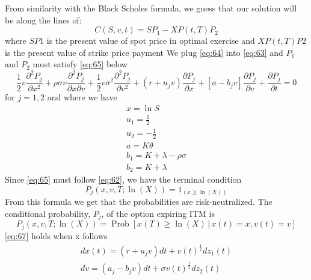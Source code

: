 \documentclass{article}
\DeclareMathOperator{\Prob}{Prob}
\begin{document}
From similarity with the Black Scholes formula, we guess that our solution will be along the lines of:
\begin{equation} \label{eq:64}
     C(S, v, t) = SP_{1} - XP(t, T)P_{2}
\end{equation}
where $SP1$ is the present value of spot price in optimal exercise and $XP(t, T)P2$ is the present value of strike price payment
We plug \ref{eq:64} into \ref{eq:63} and $P_{1}$ and $P_{2}$ must satisfy \ref{eq:65} below
\begin{equation} \label{eq:65}
    \frac{1}{2}v\frac{\partial^{2} P_{j}}{\partial x^{2}} + \rho \sigma v \frac{\partial^{2} P_{j}}{\partial x \partial v} + \frac{1}{2}v\sigma^{2}\frac{\partial^{2} P_{j}}{\partial v^{2}} + (r + u_{j} v) \frac{\partial P_{j}}{\partial x} + [a-b_{j}v] \frac{\partial P_{j}}{\partial v} + \frac{\partial P_{j}}{\partial t} = 0
\end{equation}
for $j=1,2$ and where we have 
\begin{equation*}
   \begin{gathered}
   x=\ln S \\
   u_{1} = \frac{1}{2} \\
   u_{2} = -\frac{1}{2} \\
   a = K\theta \\ 
   b_{1} = K + \lambda - \rho \sigma \\ 
   b_{2} = K + \lambda
   \end{gathered}
\end{equation*}
Since \ref{eq:65} must follow \ref{eq:62}, we have the terminal condition
\begin{equation}\label{eq:66}
    P_{j}(x, v, T; \ln(X)) = 1_{(x \geq \ln(X))}
\end{equation}
From this formula we get that the probabilities are risk-neutralized. The conditional probability, $P_{j}$, of the option expiring ITM is
\begin{equation} \label{eq:67}
    P_{j}(x, v, T; \ln(X)) = \Prob[x(T) \geq \ln(X)\, | \,x(t) = x, v(t) = v]
\end{equation}
\ref{eq:67} holds when x follows
\begin{equation}
    \begin{gathered}
    dx(t) = (r + u_{j} v) dt + v(t)^{\frac{1}{2}} dz_{1}(t) \\
    dv = (a_{j} - b_{j} v) dt + \sigma v(t)^{\frac{1}{2}} dz_{2}(t)
    \end{gathered}
\end{equation}
\end{document}
